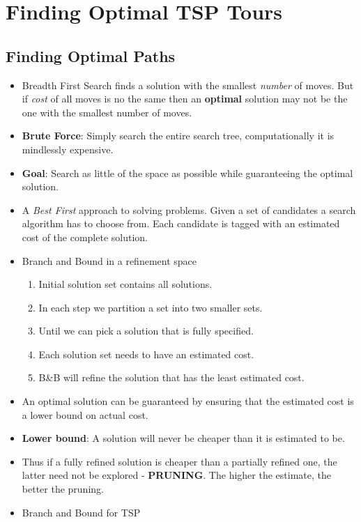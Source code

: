 \documentclass[a4paper]{article}
\begin{document}
\section{Finding Optimal TSP Tours}
\subsection{Finding Optimal Paths}
\begin{itemize}
    \item Breadth First Search finds a solution with the smallest \textit{number} of moves. But if \textit{cost} of all moves is no the same then an \textbf{optimal} solution may not be the one with the smallest number of moves.
    \item \textbf{Brute Force}: Simply search the entire search tree, computationally it is mindlessly expensive.
    \item \textbf{Goal}: Search as little of the space as possible while guaranteeing the optimal solution.
    \item A \textit{Best First} approach to solving problems. Given a set of candidates a search algorithm has to choose from. Each candidate is tagged with an estimated cost of the complete solution.
    \item Branch and Bound in a refinement space
    \begin{enumerate}
        \item Initial solution set contains all solutions.
        \item In each step we partition a set into two smaller sets.
        \item Until we can pick a solution that is fully specified.
        \item Each solution set needs to have an estimated cost.
        \item B\&B will refine the solution that has the least estimated cost.
    \end{enumerate}
    \item An optimal solution can be guaranteed by ensuring that the estimated cost is a lower bound on actual cost.
    \item \textbf{Lower bound}: A solution will never be cheaper than it is estimated to be.
    \item Thus if a fully refined solution is cheaper than a partially refined one, the latter need not be explored - \textbf{PRUNING}. The higher the estimate, the better the pruning.
    \item Branch and Bound for TSP

\end{itemize}
\end{document}

